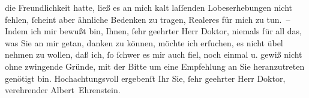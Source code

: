 \begin{ledgroupsized}[t]{13cm}
               die Freundlichkeit hatte, ließ es an mich kalt laſſenden Lobeserhebungen nicht
               fehlen, ſcheint aber ähnliche Bedenken zu tragen, Realeres für mich zu tun. – Indem
               ich mir bewußt bin, Ihnen, ſehr geehrter Herr Doktor, niemals für all das, was Sie an
               mir getan, danken zu können, möchte ich erſuchen, es nicht übel nehmen zu wollen, daß
               ich, ſo ſchwer es mir auch fiel, noch einmal u. gewiß nicht ohne zwingende Gründe,
               mit der Bitte um eine Empfehlung an Sie heranzutreten genötigt bin. Hochachtungsvoll
               ergebenſt Ihr Sie, ſehr geehrter Herr Doktor, verehrender\pend
           \pstart \spacefill\mbox{Albert Ehrenstein.}\pend{}
         
         \endnumbering{}\end{ledgroupsized}  \newcommand{\dateiname}{L01826}\newcommand{\titel}{Albert Ehrenstein an Arthur Schnitzler, 24. 1. 1909}\newcommand{\editorInnen}{Martin Anton Müller und Gerd-Hermann Susen}
      